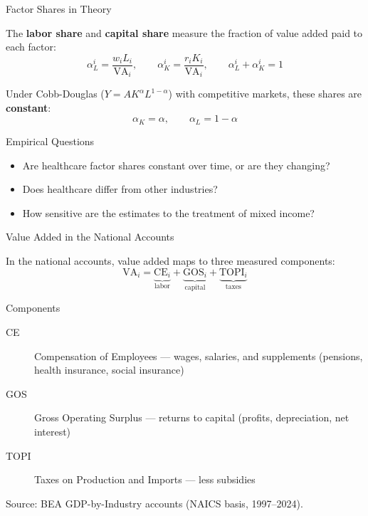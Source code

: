 \begin{frame}{Factor Shares in Theory}

The \textbf{labor share} and \textbf{capital share} measure the fraction of value added paid to each factor:
%
\begin{equation*}
    \alpha_L^i = \frac{w_i L_i}{\text{VA}_i}, \qquad \alpha_K^i = \frac{r_i K_i}{\text{VA}_i}, \qquad \alpha_L^i + \alpha_K^i = 1
\end{equation*}

Under Cobb-Douglas ($Y = AK^{\alpha} L^{1-\alpha}$) with competitive markets, these shares are \textbf{constant}:
%
\begin{equation*}
    \alpha_K = \alpha, \qquad \alpha_L = 1 - \alpha
\end{equation*}

\begin{block}{Empirical Questions}
\begin{itemize}
    \item Are healthcare factor shares constant over time, or are they changing?
    \item Does healthcare differ from other industries?
    \item How sensitive are the estimates to the treatment of mixed income?
\end{itemize}
\end{block}

\end{frame}

\begin{frame}{Value Added in the National Accounts}

In the national accounts, value added maps to three measured components:
%
\begin{equation*}
    \text{VA}_i = \underbrace{\text{CE}_i}_{\text{labor}} + \underbrace{\text{GOS}_i}_{\text{capital}} + \underbrace{\text{TOPI}_i}_{\text{taxes}}
\end{equation*}

\begin{block}{Components}
\small
\begin{description}
    \item[CE] Compensation of Employees --- wages, salaries, and supplements (pensions, health insurance, social insurance)
    \item[GOS] Gross Operating Surplus --- returns to capital (profits, depreciation, net interest)
    \item[TOPI] Taxes on Production and Imports --- less subsidies
\end{description}
\end{block}

\vfill
{\footnotesize Source: BEA GDP-by-Industry accounts (NAICS basis, 1997--2024).}

\end{frame}

